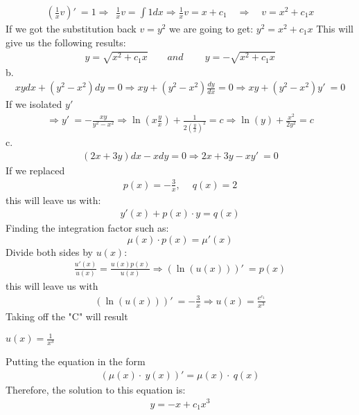 \begin{align}
    \left(\frac{1}{x}v\right)'\:=1  \Rightarrow  \ \ \frac{1}{x}v=\int 1dx \Rightarrow 
\frac{1}{x}v=x+c_1 \quad
\Rightarrow \quad
v=x^2+c_1x
\end{align}
If we got the substitution back $v=y^2$ we are going to get: $y^2=x^2+c_1x$
This will give us the following results:
\begin{align}
    y=\sqrt{x^2+c_1x}\qquad and \qquad \:y=-\sqrt{x^2+c_1x}
\end{align}
b. 
\begin{align}
    xydx+\left(y^2-x^2\right)dy=0 \Longrightarrow 
xy+\left(y^2-x^2\right)\frac{dy}{dx}=0
\Longrightarrow 
xy+\left(y^2-x^2\right)y'\:=0 
\end{align}
If we isolated $y'$
\begin{align}
    \Longrightarrow 
y'\:=-\frac{xy}{y^2-x^2}
\Longrightarrow 
\ln \left(x\frac{y}{x}\right)+\frac{1}{2\left(\frac{y}{x}\right)^2}=c
\Longrightarrow 
\ln \left(y\right)+\frac{x^2}{2y^2}=c
\end{align}
c.
\begin{align}
    \left(2x+3y\right)dx-xdy=0
\Longrightarrow 
2x+3y-xy'\:=0
\end{align}
If we replaced
\begin{align}
    p\left(x\right)=-\frac{3}{x},\:\quad q\left(x\right)=2 
\end{align}
this will leave us with:
\begin{align}
    y'\left(x\right)+p\left(x\right)\cdot y=q\left(x\right)
\end{align}
Finding the integration factor such as: 
\begin{equation}
    \mu \left(x\right)\cdot p\left(x\right)=\mu '\left(x\right)
\end{equation}
Divide both sides by $u(x)$: 
\begin{align}
\frac{u'\left(x\right)}{u\left(x\right)}=\frac{u\left(x\right)p\left(x\right)}{u\left(x\right)}
\Rightarrow \left(\ln \left(u\left(x\right)\right)\right)'\:=p\left(x\right)
\end{align}
this will leave us with
\begin{align}
    \left(\ln \left(u\left(x\right)\right)\right)'\:=-\frac{3}{x}
    \Rightarrow u\left(x\right)=\frac{e^{c_1}}{x^3}
\end{align}
Taking off the "C" will result 
\begin{raggedleft}
    \qquad $u\left(x\right)=\frac{1}{x^3}$
\end{raggedleft}
\newline
\break
Putting the equation  in the form 
\begin{align}
    \left(\mu \left(x\right)\cdot \:y\left(x\right)\right)'=\mu \left(x\right)\cdot \:q\left(x\right)
\end{align}
Therefore, the solution to this equation is: 
\begin{align}
    y=-x+c_1x^3
\end{align}
